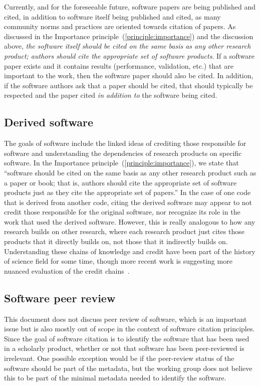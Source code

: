 \documentclass[11pt, oneside]{amsart}
\begin{document}
Currently, and for the foreseeable future, software papers are being published and cited,
in addition to software itself being published and cited, as many community norms and practices are
oriented towards citation of papers.
As discussed in the Importance principle~(\ref{principle:importance}) and the discussion above, \textit{the software
itself should be cited on the same basis as any other research product; authors should cite the appropriate set of software products}.
If a software paper exists and it contains results (performance, validation, etc.) that are
important to the work, then the software paper should also be cited.
In addition, if the software authors ask that a paper should be cited, that should typically be respected and the paper cited \textit{in addition to} the software being cited.

\subsection{Derived software}

The goals of software include the linked ideas of crediting those responsible for software and understanding the dependencies of research products on specific software.
In the Importance principle~(\ref{principle:importance}), we state that
``software should be cited on the same basis as any other research product such as a paper or book; that is, authors should cite the appropriate set of software products just as they cite the appropriate set of papers.''
In the case of one code that is derived from another code, citing the derived software may appear to not credit those responsible for the original software, nor recognize its role in the work that used the derived software.
However, this is really analogous to how any research builds on other research, where each research product just cites those products that it directly builds on, not those that it indirectly builds on.
Understanding these chains of knowledge and credit have been part of the history of science field for some time, though more recent work is suggesting more nuanced evaluation of the credit chains~\cite{casrai-credit, transitive_credit_json-ld}.

\subsection{Software peer review}

This document does not discuss peer review of software, which is an important issue but is
also mostly out of scope in the context of software citation principles.
Since the goal of software citation is to identify the software
that has been used in a scholarly product, whether or not that software has been peer-reviewed
is irrelevant.  One possible exception would be if the peer-review status of the software should
be part of the metadata, but the working group does not believe this to be part of the
minimal metadata needed to identify the software.
\end{document}
